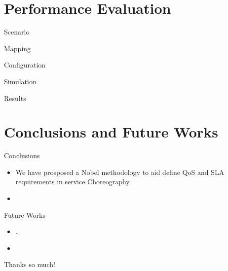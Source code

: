 \documentclass[xcolor=svgnames]{beamer}
\begin{document}
  


  

\section{Performance Evaluation}
  \begin{frame}{Scenario}
  
  \end{frame}


  \begin{frame}{Mapping}
   
  \end{frame}


  \begin{frame}{ Configuration}
   
  \end{frame}


  \begin{frame}{ Simulation}
   
  \end{frame}



  \begin{frame}{ Results}
   
  \end{frame}





\section{Conclusions and Future Works}
   \begin{frame}{Conclusions}
       \begin{itemize}
         \item <1->  We have prosposed a Nobel methodology to aid define QoS and SLA requirements in service Choreography.
	 \item <2->  
       \end{itemize}
   \end{frame}

  \begin{frame}{Future Works}
       \begin{itemize}
         \item <1->  .
	 \item <2->  
       \end{itemize}
   \end{frame}





    \begin{frame}%
        \begin{block}{}\vspace{-.3\baselineskip}
        	Thanks so much!
        \end{block}

    \end{frame}
\end{document}
